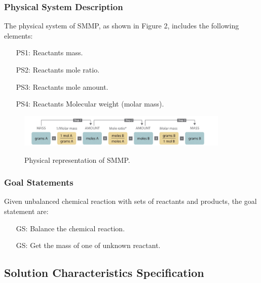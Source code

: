 \documentclass[12pt]{article}
\newcounter{goalnum} %
\begin{document}
\subsubsection{Physical System Description} \label{sec_phySystDescrip}

The physical system of SMMP, as shown in Figure 2,
includes the following elements:

\begin{itemize}

\item[PS1:] Reactants mass.\\
\item[PS2:] Reactants mole ratio.\\
\item[PS3:] Reactants mole amount.\\
\item[PS4:] Reactants Molecular weight (molar mass).\\

\end{itemize}

 \begin{figure}[h!]
 \begin{center}
 {
  \includegraphics[width=0.9\textwidth]{physical}
 }
 \caption{\label{ Figure 2:} Physical representation of SMMP.}
 \end{center}
 \end{figure}

\subsubsection{Goal Statements}

\noindent Given unbalanced chemical reaction with sets of reactants and
products, the goal statement are:

\begin{itemize}
\item[GS\refstepcounter{goalnum}\thegoalnum \label{G1}:] Balance the chemical
  reaction.
\item[GS\refstepcounter{goalnum}\thegoalnum \label{G2}:] Get the mass of one of
  unknown reactant.
\end{itemize}

\subsection{Solution Characteristics Specification}
\end{document}
